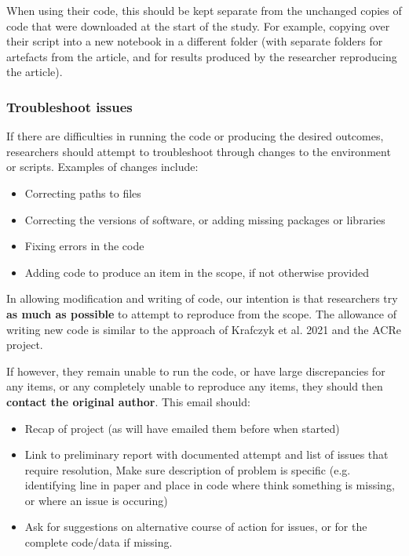When using their code, this should be kept separate from the unchanged copies of code that were downloaded at the start of the study. For example, copying over their script into a new notebook in a different folder (with separate folders for artefacts from the article, and for results produced by the researcher reproducing the article).

\subsubsection{Troubleshoot issues}

If there are difficulties in running the code or producing the desired outcomes, researchers should attempt to troubleshoot through changes to the environment or scripts. Examples of changes include:
\begin{itemize}
    \item Correcting paths to files
    \item Correcting the versions of software, or adding missing packages or libraries
    \item Fixing errors in the code
    \item Adding code to produce an item in the scope, if not otherwise provided
\end{itemize}

In allowing modification and writing of code, our intention is that researchers try \textbf{as much as possible} to attempt to reproduce from the scope. The allowance of writing new code is similar to the approach of Krafczyk et al. 2021\autocite{krafczyk_learning_2021} and the ACRe project\autocite{berkeley_initiative_for_transparency_in_the_social_sciences_guide_2022}.

If however, they remain unable to run the code, or have large discrepancies for any items, or any completely unable to reproduce any items, they should then \textbf{contact the original author}. This email should:
\begin{itemize}
    \item Recap of project (as will have emailed them before when started)
    \item Link to preliminary report with documented attempt and list of issues that require resolution, Make sure description of problem is specific (e.g. identifying line in paper and place in code where think something is missing, or where an issue is occuring)
    \item Ask for suggestions on alternative course of action for issues, or for the complete code/data if missing.
\end{itemize}

